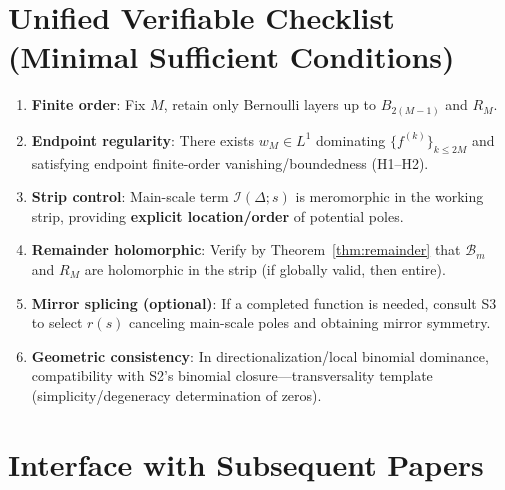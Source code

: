 \documentclass[11pt,a4paper]{article}
\theoremstyle{remark}
\begin{document}
\section{Unified Verifiable Checklist (Minimal Sufficient Conditions)}

\begin{enumerate}
\item \textbf{Finite order}: Fix $M$, retain only Bernoulli layers up to $B_{2(M-1)}$ and $R_M$.

\item \textbf{Endpoint regularity}: There exists $w_M\in L^1$ dominating $\{f^{(k)}\}_{k\le 2M}$ and satisfying endpoint finite-order vanishing/boundedness (H1--H2).

\item \textbf{Strip control}: Main-scale term $\mathcal{I}(\Delta;s)$ is meromorphic in the working strip, providing \textbf{explicit location/order} of potential poles.

\item \textbf{Remainder holomorphic}: Verify by Theorem~\ref{thm:remainder} that $\mathcal{B}_m$ and $R_M$ are holomorphic in the strip (if globally valid, then entire).

\item \textbf{Mirror splicing (optional)}: If a completed function is needed, consult S3 to select $r(s)$ canceling main-scale poles and obtaining mirror symmetry.

\item \textbf{Geometric consistency}: In directionalization/local binomial dominance, compatibility with S2's binomial closure---transversality template (simplicity/degeneracy determination of zeros).
\end{enumerate}

\section{Interface with Subsequent Papers}
\end{document}
